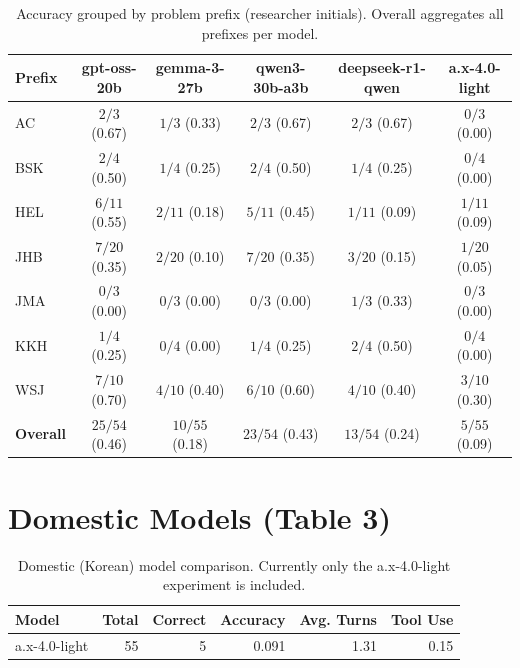 \documentclass{article}
\begin{document}
\begin{table}[h!]
\centering
\begin{tabular}{lccccc}
\toprule
\textbf{Prefix} & \textbf{gpt-oss-20b} & \textbf{gemma-3-27b} & \textbf{qwen3-30b-a3b} & \textbf{deepseek-r1-qwen} & \textbf{a.x-4.0-light} \\\midrule
AC  & $2/3$  (0.67) & $1/3$  (0.33) & $2/3$  (0.67) & $2/3$  (0.67) & $0/3$  (0.00) \\
BSK & $2/4$  (0.50) & $1/4$  (0.25) & $2/4$  (0.50) & $1/4$  (0.25) & $0/4$  (0.00) \\
HEL & $6/11$ (0.55) & $2/11$ (0.18) & $5/11$ (0.45) & $1/11$ (0.09) & $1/11$ (0.09) \\
JHB & $7/20$ (0.35) & $2/20$ (0.10) & $7/20$ (0.35) & $3/20$ (0.15) & $1/20$ (0.05) \\
JMA & $0/3$  (0.00) & $0/3$  (0.00) & $0/3$  (0.00) & $1/3$  (0.33) & $0/3$  (0.00) \\
KKH & $1/4$  (0.25) & $0/4$  (0.00) & $1/4$  (0.25) & $2/4$  (0.50) & $0/4$  (0.00) \\
WSJ & $7/10$ (0.70) & $4/10$ (0.40) & $6/10$ (0.60) & $4/10$ (0.40) & $3/10$ (0.30) \\\midrule
\textbf{Overall} & $25/54$ (0.46) & $10/55$ (0.18) & $23/54$ (0.43) & $13/54$ (0.24) & $5/55$ (0.09) \\
\bottomrule
\end{tabular}
\caption{Accuracy grouped by problem prefix (researcher initials). Overall aggregates all prefixes per model.}
\end{table}

\bigskip

\section*{Domestic Models (Table 3)}

\begin{table}[h!]
\centering
\begin{tabular}{lrrrrr}
\toprule
\textbf{Model} & \textbf{Total} & \textbf{Correct} & \textbf{Accuracy} & \textbf{Avg. Turns} & \textbf{Tool Use} \\\midrule
a.x-4.0-light & 55 & 5 & 0.091 & 1.31 & 0.15 \\\bottomrule
\end{tabular}
\caption{Domestic (Korean) model comparison. Currently only the a.x-4.0-light experiment is included.}
\end{table}
\end{document}
